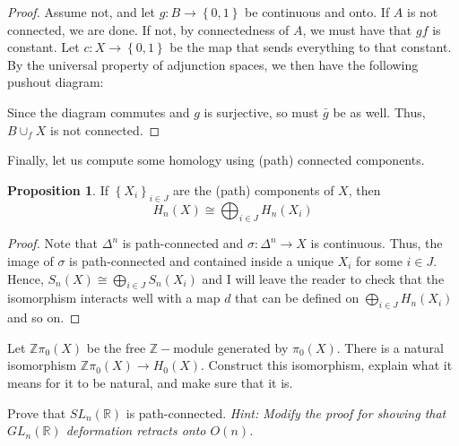 \documentclass[12pt,reqno]{amsart}
\numberwithin{theorem}{section}
\theoremstyle{definition}
\theoremstyle{remark}
\numberwithin{equation}{section}
\newcommand{\Z}{\mathbb Z}
\newcommand{\set}[1]{\left \{ #1 \right \}}
\theoremstyle{definition}
\newtheorem{prop}[theorem]{Proposition}
\newcommand{\R}{\mathbb{R}}
\begin{document}
\begin{proof}
    Assume not, and let $g:B\rightarrow \set{0,1} $ be continuous and onto. If $A$ is not connected, we are done. If not, by connectedness of $A$, we must have that $gf$ is constant. Let $c:X\rightarrow \set{0,1}$ be the map that sends everything to that constant. By the universal property of adjunction spaces, we then have the following pushout diagram:
    \begin{center}
    \end{center}
    Since the diagram commutes and $g$ is surjective, so must $\bar g$ be as well. Thus, $B\cup_f X$ is not connected.
\end{proof}

Finally, let us compute some homology using (path) connected components.
\begin{prop}
    If $\set{X_i}_{i \in J}$ are the (path) components of $X$, then
    $$H_n(X) \cong \bigoplus_{i\in J }H_n(X_i)$$
\end{prop}
\begin{proof}
    Note that $\Delta^n$ is path-connected and $\sigma:\Delta^n\rightarrow X$ is continuous. Thus, the image of $\sigma$ is path-connected and contained inside a unique $X_i$ for some $i \in J$. Hence, $S_n(X)\cong \bigoplus_{i \in J} S_n(X_i)$ and I will leave the reader to check that the isomorphism interacts well with a map $d$ that can be defined on $\bigoplus_{i\in J }H_n(X_i)$ and so on.
\end{proof}
\begin{exercise}
    Let $\Z\pi_0(X)$ be the free $\Z-$module generated by $\pi_0(X)$. There is a natural isomorphism $\Z\pi_0(X)\rightarrow H_0(X)$. Construct this isomorphism, explain what it means for it to be natural, and make sure that it is.
\end{exercise}
\begin{exercise}
    Prove that $SL_n(\R)$ is path-connected. \textit{Hint: Modify the proof for showing that $GL_n(\R)$ deformation retracts onto $O(n)$.}
\end{exercise}
\end{document}
